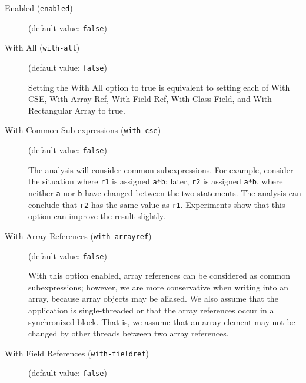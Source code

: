 \documentclass{article}
\begin{document}
\begin{description}

\item[Enabled ({\tt enabled})]
(default value: {\tt false})






\item[With All ({\tt with-all})]
(default value: {\tt false})





\par

Setting the With All option to true is equivalent to setting each
of With CSE, With Array Ref, With Field Ref,
With Class Field, and  With Rectangular Array to true.
                        


\item[With Common Sub-expressions ({\tt with-cse})]
(default value: {\tt false})





\par

The analysis will consider common subexpressions.  For example,
consider the situation where {\tt r1} is assigned
{\tt a*b}; later, {\tt r2} is assigned {\tt a*b}, where
neither {\tt a} nor {\tt b} have changed between the two
statements. The analysis can conclude that {\tt r2} has the
same value as {\tt r1}. Experiments show that this option can
improve the result slightly.



\item[With Array References ({\tt with-arrayref})]
(default value: {\tt false})





\par

With this option enabled, array references can be considered as
common subexpressions; however, we are more conservative when
writing into an array, because array objects may be aliased. We
also assume that the application is single-threaded or that the
array references occur in a synchronized block. That is, we
assume that an array element may not be changed by other threads
between two array references.



\item[With Field References ({\tt with-fieldref})]
(default value: {\tt false})






\end{description}
\end{document}
